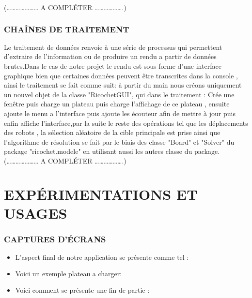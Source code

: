 \documentclass[a4paper]{article} %
\begin{document}
(………………… A COMPLÉTER ……………….)

\subsubsection{CHAÎNES DE TRAITEMENT }
Le traitement de données renvoie à une série de processus qui permettent d'extraire de l'information ou de produire un rendu a partir de données brutes.Dans le cas de notre projet le rendu est sous forme d'une interface graphique bien que certaines données peuvent être transcrites dans la console , ainsi le traitement se fait comme suit: à partir du main nous créons uniquement un nouvel objet de la classe "RicochetGUI", qui dans le traitement :
Crée une fenêtre puis charge un plateau puis charge l'affichage de ce plateau , ensuite ajoute le menu a l'interface puis ajoute les écouteur afin de mettre à jour puis enfin affiche l'interface,par la suite le reste des opérations tel que les déplacements des robots , la sélection aléatoire de la cible principale est prise ainsi que l'algorithme de résolution se fait par le biais des classe "Board" et "Solver" du package "ricochet.modele" en utilisant aussi les autres classe du package.  
(………………… A COMPLÉTER ……………….)


\section{EXPÉRIMENTATIONS ET USAGES }
\subsubsection{CAPTURES D’ÉCRANS }
\begin{itemize}
\item L'aspect final de notre application se présente comme tel :

\begin{figure}

\end{figure}


\item Voici un exemple plateau a charger:

\begin{figure}

\end{figure}

\item Voici comment se présente une fin de partie : 
\begin{figure}

\end{figure}

\end{itemize}
\end{document}
